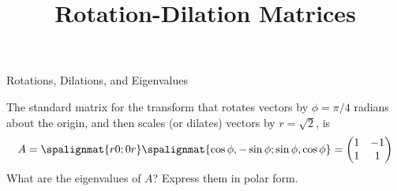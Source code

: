 \title{Rotation-Dilation Matrices}
\subtitle{\SubTitleName}
\institute[]{\Course}
\author{\Instructor}
\maketitle   


\begin{frame}{Rotations, Dilations, and Eigenvalues}

    The standard matrix for the transform that \pause rotates vectors by $\phi = \pi/4$ radians about the origin, and then scales (or dilates) vectors by $r = \sqrt{2}$, is 
    \pause 
    \[ A =  
    \spalignmat{r 0;0 r}\spalignmat{\cos\phi ,-\sin\phi ;\sin\phi ,\cos\phi } = 
    \begin{pmatrix} 1 & -1 \\ 1 & 1 \end{pmatrix} \]
    \pause 
    What are the eigenvalues of $A$? Express them in polar form. 
    
\end{frame}



